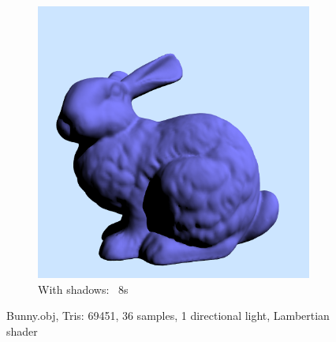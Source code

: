 \begin{figure}
\begin{subfigure}[b]{0.4\textwidth}
		\includegraphics[width=\textwidth]{week1/bunny_shadowed.png}
		\caption{With shadows: ~8s}
		\label{fig:bunnyshadowed}
	\end{subfigure}
	\caption{Bunny.obj, Tris: 69451, 36 samples, 1 directional light, Lambertian shader}
	\label{fig:shadows}
\end{figure}

